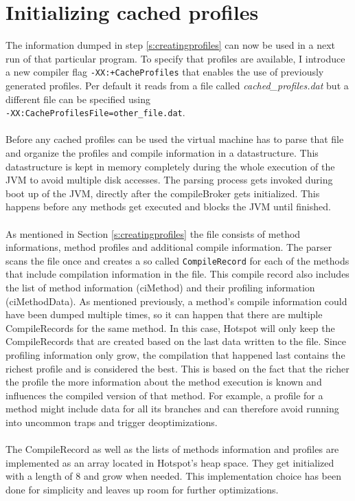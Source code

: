 \section{Initializing cached profiles}
\label{s:initializingprofiles}
The information dumped in step \ref{s:creatingprofiles} can now be used in a next run of that particular program.
To specify that profiles are available, I introduce a new compiler flag \texttt{-XX:+CacheProfiles} that enables the use of previously generated profiles. Per default it reads from a file called \textit{cached\_profiles.dat} but a different file can be specified using \\\texttt{-XX:CacheProfilesFile=other\_file.dat}.
\\\\
Before any cached profiles can be used the virtual machine has to parse that file and organize the profiles and compile information in a datastructure. This datastructure is kept in memory completely during the whole execution of the JVM to avoid multiple disk accesses.
The parsing process gets invoked during boot up of the JVM, directly after the compileBroker gets initialized. This happens before any methods get executed and blocks the JVM until finished.
\\\\
As mentioned in Section \ref{s:creatingprofiles} the file consists of method informations, method profiles and additional compile information. The parser scans the file once and creates a so called \texttt{CompileRecord} for each of the methods that include compilation information in the file. This compile record also includes the list of method information (ciMethod) and their profiling information (ciMethodData).
As mentioned previously, a method's compile information could have been dumped multiple times, so it can happen that there are multiple CompileRecords for the same method. In this case, Hotspot will only keep the CompileRecords that are created based on the last data written to the file.
Since profiling information only grow, the compilation that happened last contains the richest profile and is considered the best.
This is based on the fact that the richer the profile the more information about the method execution is known and influences the compiled version of that method. For example, a profile for a method might include data for all its branches and can therefore avoid running into uncommon traps and trigger deoptimizations.
\\\\
The CompileRecord as well as the lists of methods information and profiles are implemented as an array located in Hotspot's heap space.
They get initialized with a length of 8 and grow when needed. This implementation choice has been done for simplicity and leaves up room for further optimizations.

